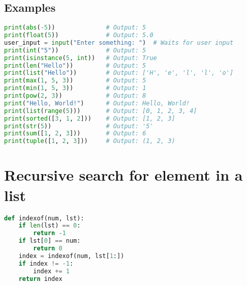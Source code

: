 \documentclass[11pt]{article}
\begin{document}
\subsection{Examples}

\begin{lstlisting}[language=Python]
print(abs(-5))              # Output: 5
print(float(5))             # Output: 5.0
user_input = input("Enter something: ")  # Waits for user input
print(int("5"))             # Output: 5
print(isinstance(5, int))   # Output: True
print(len("Hello"))         # Output: 5
print(list("Hello"))        # Output: ['H', 'e', 'l', 'l', 'o']
print(max(1, 5, 3))         # Output: 5
print(min(1, 5, 3))         # Output: 1
print(pow(2, 3))            # Output: 8
print("Hello, World!")      # Output: Hello, World!
print(list(range(5)))       # Output: [0, 1, 2, 3, 4]
print(sorted([3, 1, 2]))    # Output: [1, 2, 3]
print(str(5))               # Output: '5'
print(sum([1, 2, 3]))       # Output: 6
print(tuple([1, 2, 3]))     # Output: (1, 2, 3)
\end{lstlisting}

\section{Recursive search for element in a list}

\begin{lstlisting}[language=Python]
def indexof(num, lst):
    if len(lst) == 0:
        return -1
    if lst[0] == num:
        return 0
    index = indexof(num, lst[1:])
    if index != -1:
        index += 1
    return index
\end{lstlisting}
\end{document}
